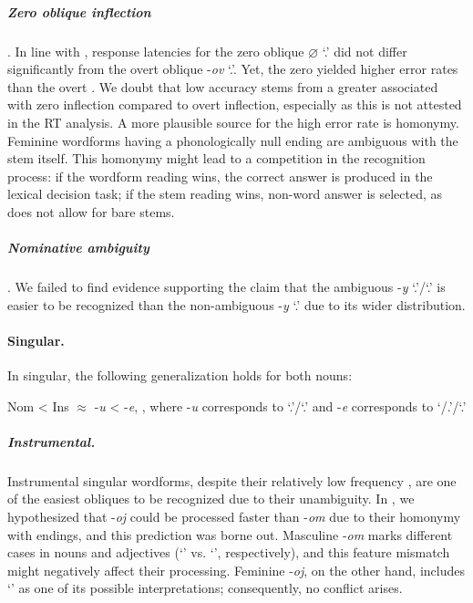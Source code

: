 \documentclass[output=paper, modfonts,newtxmath,hidelinks]{langscibook}
\begin{document}
\subparagraph*{{Zero oblique inflection}}. In line with \citet{gor2017processing}, response latencies for the zero oblique \textit{$\varnothing$} `\genn.\pl' did not differ significantly from the overt oblique -\textit{ov} `\genn.\pl'. Yet, the zero  yielded higher error rates than the overt . We doubt that low accuracy stems from a greater  associated with zero inflection compared to overt inflection, especially as this is not attested in the RT analysis. A more plausible source for the high error rate is homonymy. Feminine   wordforms having a phonologically null ending are ambiguous with the stem itself. This homonymy might lead to a competition in the recognition process: if the wordform reading wins, the correct answer is produced in the lexical decision task; if the stem reading wins, non-word answer is selected, as  does not allow for bare stems.

\subparagraph*{{Nominative ambiguity}}. We failed to find evidence supporting the claim that the ambiguous  -\textit{y} `\nomm.\pl'\slash `\genn.\sg' is easier to be recognized than the non-ambiguous  -\textit{y} `\nomm.\pl' due to its wider distribution.\\

\paragraph*{Singular.} In singular, the following generalization holds for both nouns:

\ea	Nom < Ins $\approx$ -\textit{u} < -\textit{e}, , where -\textit{u} corresponds to `\accc.\fem'\slash `\datt.\masc' and -\textit{e} corresponds to `{\datt/\locc.\fem}’\slash `{\locc.\masc}’
\z 

\subparagraph*{{Instrumental.}} Instrumental singular wordforms, despite their relatively low frequency \citep{samojlova2014frequencies}, are one of the easiest obliques to be recognized due to their unambiguity. In , we hypothesized that   -\textit{oj} could be processed faster than   -\textit{om} due to their homonymy with  endings, and this prediction was borne out. Masculine -\textit{om} marks different cases in nouns and adjectives (`\ins' vs. `\locc', respectively), and this feature mismatch might negatively affect their processing. Feminine  -\textit{oj}, on the other hand, includes `\ins' as one of its possible interpretations; consequently, no conflict arises.
\end{document}
